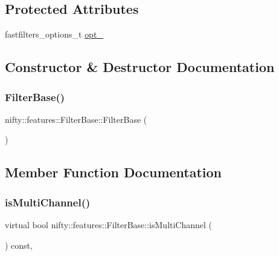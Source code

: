 \subsection*{Protected Attributes}
\begin{DoxyCompactItemize}
\item 
fastfilters\+\_\+options\+\_\+t \hyperlink{structnifty_1_1features_1_1FilterBase_a4bd3a5f88a4c061e80f0b0c4a1074c8c}{opt\+\_\+}
\end{DoxyCompactItemize}


\subsection{Constructor \& Destructor Documentation}
\mbox{\label{structnifty_1_1features_1_1FilterBase_ac10b9d69df645dd2feb7ce555e544502}} 
\subsubsection{\texorpdfstring{Filter\+Base()}{FilterBase()}}
{\footnotesize\ttfamily nifty\+::features\+::\+Filter\+Base\+::\+Filter\+Base (\begin{DoxyParamCaption}{ }\end{DoxyParamCaption})\hspace{0.3cm}{\ttfamily [inline]}}



\subsection{Member Function Documentation}
\mbox{\label{structnifty_1_1features_1_1FilterBase_a1c278e2b6ef0cb2a5bba2f758c6855e2}} 
\subsubsection{\texorpdfstring{is\+Multi\+Channel()}{isMultiChannel()}}
{\footnotesize\ttfamily virtual bool nifty\+::features\+::\+Filter\+Base\+::is\+Multi\+Channel (\begin{DoxyParamCaption}{ }\end{DoxyParamCaption}) const\hspace{0.3cm}{\ttfamily [inline]}, {}}



